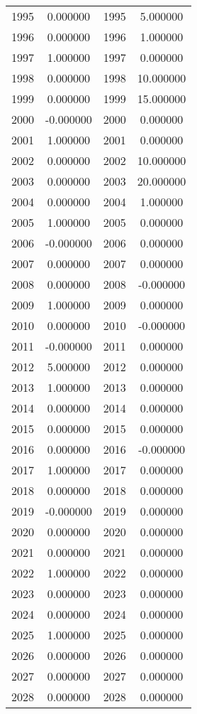 \documentclass[12pt]{article}
\begin{document}
\begin{longtable}{@{}cccc@{}}
1995 & 0.000000 & 1995 & 5.000000 \\
1996 & 0.000000 & 1996 & 1.000000 \\
1997 & 1.000000 & 1997 & 0.000000 \\
1998 & 0.000000 & 1998 & 10.000000 \\
1999 & 0.000000 & 1999 & 15.000000 \\
2000 & -0.000000 & 2000 & 0.000000 \\
2001 & 1.000000 & 2001 & 0.000000 \\
2002 & 0.000000 & 2002 & 10.000000 \\
2003 & 0.000000 & 2003 & 20.000000 \\
2004 & 0.000000 & 2004 & 1.000000 \\
2005 & 1.000000 & 2005 & 0.000000 \\
2006 & -0.000000 & 2006 & 0.000000 \\
2007 & 0.000000 & 2007 & 0.000000 \\
2008 & 0.000000 & 2008 & -0.000000 \\
2009 & 1.000000 & 2009 & 0.000000 \\
2010 & 0.000000 & 2010 & -0.000000 \\
2011 & -0.000000 & 2011 & 0.000000 \\
2012 & 5.000000 & 2012 & 0.000000 \\
2013 & 1.000000 & 2013 & 0.000000 \\
2014 & 0.000000 & 2014 & 0.000000 \\
2015 & 0.000000 & 2015 & 0.000000 \\
2016 & 0.000000 & 2016 & -0.000000 \\
2017 & 1.000000 & 2017 & 0.000000 \\
2018 & 0.000000 & 2018 & 0.000000 \\
2019 & -0.000000 & 2019 & 0.000000 \\
2020 & 0.000000 & 2020 & 0.000000 \\
2021 & 0.000000 & 2021 & 0.000000 \\
2022 & 1.000000 & 2022 & 0.000000 \\
2023 & 0.000000 & 2023 & 0.000000 \\
2024 & 0.000000 & 2024 & 0.000000 \\
2025 & 1.000000 & 2025 & 0.000000 \\
2026 & 0.000000 & 2026 & 0.000000 \\
2027 & 0.000000 & 2027 & 0.000000 \\
2028 & 0.000000 & 2028 & 0.000000 \\

\end{longtable}
\end{document}
